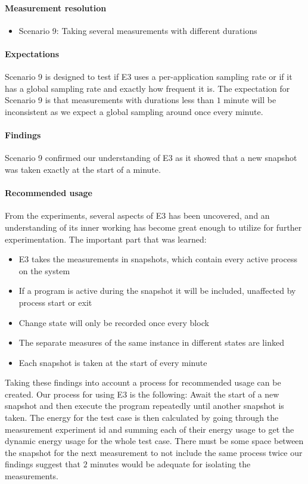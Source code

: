 \paragraph{Measurement resolution}

\begin{itemize}
    \item Scenario 9: Taking several measurements with different durations
\end{itemize}

\paragraph{Expectations}
Scenario 9 is designed to test if E3 uses a per-application sampling rate or if it has a global sampling rate and exactly how frequent it is. The expectation for Scenario 9 is that measurements with durations less than $1$ minute will be inconsistent as we expect a global sampling around once every minute.

\paragraph{Findings}
Scenario 9 confirmed our understanding of E3 as it showed that a new snapshot was taken exactly at the start of a minute.

\paragraph {Recommended usage}
From the experiments, several aspects of E3 has been uncovered, and an understanding of its inner working has become great enough to utilize for further experimentation. The important part that was learned:

\begin{itemize}
    \item E3 takes the measurements in snapshots, which contain every active process on the system
    \item If a program is active during the snapshot it will be included, unaffected by process start or exit
    \item Change state will only be recorded once every block
    \item The separate measures of the same instance in different states are linked
    \item Each snapshot is taken at the start of every minute
\end{itemize} 

Taking these findings into account a process for recommended usage can be created. Our process for using E3 is the following: Await the start of a new snapshot and then execute the program repeatedly until another snapshot is taken. The energy for the test case is then calculated by going through the measurement experiment id and summing each of their energy usage to get the dynamic energy usage for the whole test case. There must be some space between the snapshot for the next measurement to not include the same process twice our findings suggest that $2$ minutes would be adequate for isolating the measurements.